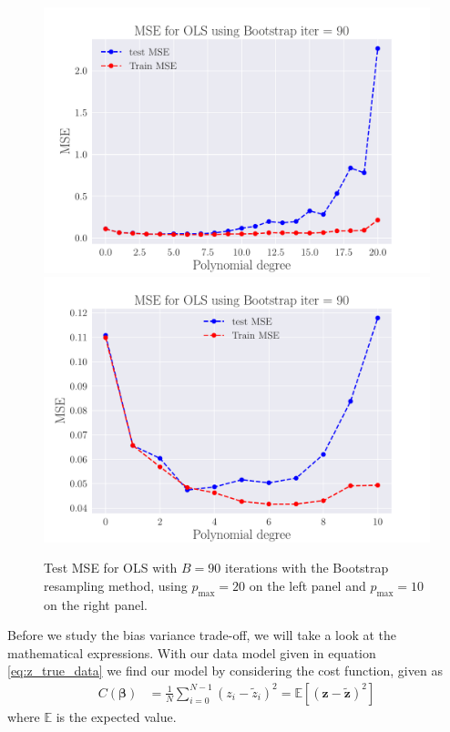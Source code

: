 \documentclass[reprint,english,notitlepage,aps,nobalancelastpage,nofootinbib]{revtex4-1}  %
\begin{document}
\begin{figure}[h]
	\includegraphics[width=\linewidth]{MSE_OLS_n30_eps02_pol20_Bootstrap_re90.pdf}
	\endminipage\hfill
	\includegraphics[width=\linewidth]{MSE_OLS_n30_eps02_pol10_Bootstrap_re90.pdf}
	\endminipage
	\caption{Test MSE for OLS with $B=90$ iterations with the Bootstrap resampling method, using $p_\text{max}=20$ on the left panel and $p_\text{max}=10$ on the right panel.}
  \label{fig:OLS_overfitting}
\end{figure}

Before we study the bias variance trade-off, we will take a look at the mathematical expressions. With our data model given in equation \eqref{eq:z_true_data} we find our model by considering the cost function, given as
\begin{align*}
  C(\bm{\beta}) &= \frac{1}{N} \sum_{i=0}^{N-1} (z_i - \tilde{z}_i)^2 = \mathbb{E}[(\mathbf{z}-\mathbf{\tilde{z}})^2]
\end{align*}
where $\mathbb{E}$ is the expected value. %
\end{document}

